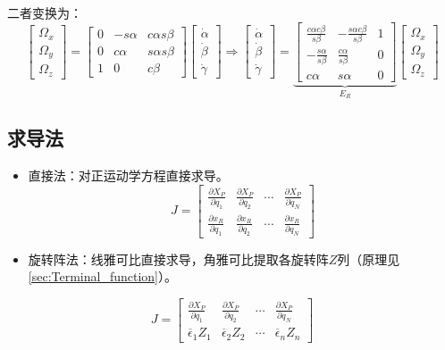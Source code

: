 \documentclass[
12pt, %
a4paper, 
oneside, %
headinclude,footinclude, %
]{scrartcl}
\begin{document}
二者变换为：
$$
\begin{bmatrix} \Omega_x \\ \Omega_y \\ \Omega_z \end{bmatrix}
=
\begin{bmatrix} 0 & -s\alpha & c\alpha s\beta \\ 0 & c\alpha & s\alpha s\beta \\ 1 & 0 & c\beta \end{bmatrix}
\begin{bmatrix} \dot{\alpha} \\ \dot{\beta} \\ \dot{\gamma} \end{bmatrix}
\Rightarrow 
\begin{bmatrix} \dot{\alpha} \\ \dot{\beta} \\ \dot{\gamma} \end{bmatrix}
=
\underbrace{[\begin{array}{ccc}
\frac{c\alpha c\beta}{s\beta} & -\frac{s\alpha c\beta}{s\beta} & 1 \\
-\frac{s\alpha}{s\beta} & \frac{c\alpha}{s\beta} & 0 \\
c\alpha & s\alpha & 0
\end{array}]}_{E_R}
\begin{bmatrix} \Omega_x \\ \Omega_y \\ \Omega_z \end{bmatrix}
$$
\subsection{求导法}
\begin{itemize}
\item 直接法：对正运动学方程直接求导。
$$ J = \begin{bmatrix} \frac{\partial X_P}{\partial q_1} & \frac{\partial X_P}{\partial q_2} & \cdots & \frac{\partial X_P}{\partial q_N} \\ \frac{\partial x_R}{\partial q_1} & \frac{\partial x_R}{\partial q_2} & \cdots & \frac{\partial x_R}{\partial q_N} \end{bmatrix} $$
\item 旋转阵法：线雅可比直接求导，角雅可比提取各旋转阵$ Z $列（原理见\ref{sec:Terminal_function}）。
\end{itemize} 
$$ J = \begin{bmatrix} \frac{\partial X_P}{\partial q_1} & \frac{\partial X_P}{\partial q_2} & \cdots & \frac{\partial X_P}{\partial q_N} \\ \overline{\epsilon}_1 Z_1 & \overline{\epsilon}_2 Z_2 & \cdots & \overline{\epsilon}_n Z_n \end{bmatrix} $$
\end{document}
